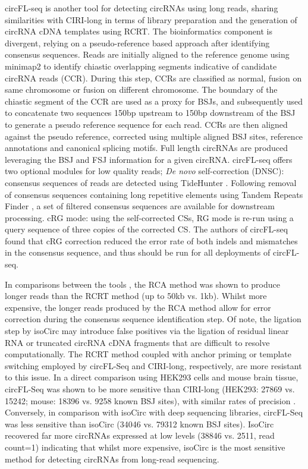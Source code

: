 circFL-seq \cite{circFLseq} is another tool for detecting circRNAs using long reads, sharing similarities with CIRI-long in terms of library preparation and the generation of circRNA cDNA templates using RCRT. The bioinformatics component is divergent, relying on a pseudo-reference based approach after identifying consensus sequences. Reads are initially aligned to the reference genome using minimap2 to identify chiastic overlapping segments indicative of candidate circRNA reads (CCR). During this step, CCRs are classified as normal, fusion on same chromosome or fusion on different chromosome. The boundary of the chiastic segment of the CCR are used as a proxy for BSJs, and subsequently used to concatenate two sequences 150bp upstream to 150bp downstream of the BSJ to generate a pseudo reference sequence for each read. CCRs are then aligned against the pseudo reference, corrected using multiple aligned BSJ sites, reference annotations and canonical splicing motifs. Full length circRNAs are produced leveraging the BSJ and FSJ information for a given circRNA. circFL-seq offers two optional modules for low quality reads; \textit{De novo} self-correction (DNSC): consensus sequences of reads are detected using TideHunter \cite{Gao2019Jul}. Following removal of consensus sequences containing long repetitive elements using Tandem Repeats Finder \cite{Benson1999Jan}, a set of filtered consensus sequences are available for downstream processing. cRG mode: using the self-corrected CSs, RG mode is re-run using a query sequence of three copies of the corrected CS. The authors of circFL-seq found that cRG correction reduced the error rate of both indels and mismatches in the consensus sequence, and thus should be run for all deployments of circFL-seq.\par 

In comparisons between the tools \cite{circFLseq,Rahimi2021Dec}, the RCA method was shown to produce longer reads than the RCRT method (up to 50kb vs. 1kb). Whilst more expensive, the longer reads produced by the RCA method allow for error correction during the consensus sequence identification step. Of note, the ligation step by isoCirc may introduce false positives via the ligation of residual linear RNA or truncated circRNA cDNA fragments that are difficult to resolve computationally. The RCRT method coupled with anchor priming or template switching employed by circFL-Seq and CIRI-long, respectively, are more resistant to this issue. In a direct comparison using HEK293 cells and mouse brain tissue, circFL-Seq was shown to be more sensitive than CIRI-long (HEK293: 27869 vs. 15242; mouse: 18396 vs. 9258 known BSJ sites), with similar rates of precision \cite{circFLseq}. Conversely, in comparison with isoCirc with deep sequencing libraries, circFL-Seq was less sensitive than isoCirc (34046 vs. 79312 known BSJ sites). IsoCirc recovered far more circRNAs expressed at low levels (38846 vs. 2511, read count=1) indicating that whilst more expensive, isoCirc is the most sensitive method for detecting circRNAs from long-read sequencing.

